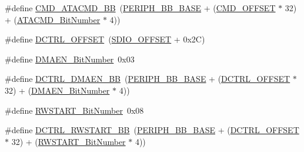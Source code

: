 \begin{DoxyCompactItemize}
\item 
\#define \hyperlink{group___s_d_i_o___private___types_definitions_gabb7e537f931b6fdd3b49e826f2e19d7c}{C\+M\+D\+\_\+\+A\+T\+A\+C\+M\+D\+\_\+\+BB}~(\hyperlink{openmotestm_2library_2inc_2stm32f10x__map_8h_aed7efc100877000845c236ccdc9e144a}{P\+E\+R\+I\+P\+H\+\_\+\+B\+B\+\_\+\+B\+A\+SE} + (\hyperlink{openmotestm_2library_2src_2stm32f10x__sdio_8c_af12d26702ce7a88d2a3dae87f000b75e}{C\+M\+D\+\_\+\+O\+F\+F\+S\+ET} $\ast$ 32) + (\hyperlink{openmotestm_2library_2src_2stm32f10x__sdio_8c_abd4fd3bb700b879f843ccc867db1832e}{A\+T\+A\+C\+M\+D\+\_\+\+Bit\+Number} $\ast$ 4))
\item 
\#define \hyperlink{group___s_d_i_o___private___types_definitions_ga948c1382c4cfd3af3e406c4d0cdd4240}{D\+C\+T\+R\+L\+\_\+\+O\+F\+F\+S\+ET}~(\hyperlink{openmotestm_2library_2src_2stm32f10x__sdio_8c_abf07aced03df5f46d57cea1d4f56d1e3}{S\+D\+I\+O\+\_\+\+O\+F\+F\+S\+ET} + 0x2\+C)
\item 
\#define \hyperlink{group___s_d_i_o___private___types_definitions_gab2af311e327213503f0dbf3d013b7944}{D\+M\+A\+E\+N\+\_\+\+Bit\+Number}~0x03
\item 
\#define \hyperlink{group___s_d_i_o___private___types_definitions_ga43f7336d4f955c6cf1f676ccbc043fe9}{D\+C\+T\+R\+L\+\_\+\+D\+M\+A\+E\+N\+\_\+\+BB}~(\hyperlink{openmotestm_2library_2inc_2stm32f10x__map_8h_aed7efc100877000845c236ccdc9e144a}{P\+E\+R\+I\+P\+H\+\_\+\+B\+B\+\_\+\+B\+A\+SE} + (\hyperlink{openmotestm_2library_2src_2stm32f10x__sdio_8c_a948c1382c4cfd3af3e406c4d0cdd4240}{D\+C\+T\+R\+L\+\_\+\+O\+F\+F\+S\+ET} $\ast$ 32) + (\hyperlink{openmotestm_2library_2src_2stm32f10x__sdio_8c_ab2af311e327213503f0dbf3d013b7944}{D\+M\+A\+E\+N\+\_\+\+Bit\+Number} $\ast$ 4))
\item 
\#define \hyperlink{group___s_d_i_o___private___types_definitions_ga773045c51d3e8daee0c181517c44a2df}{R\+W\+S\+T\+A\+R\+T\+\_\+\+Bit\+Number}~0x08
\item 
\#define \hyperlink{group___s_d_i_o___private___types_definitions_gac776c39dfac0e1ed007217133e1145c3}{D\+C\+T\+R\+L\+\_\+\+R\+W\+S\+T\+A\+R\+T\+\_\+\+BB}~(\hyperlink{openmotestm_2library_2inc_2stm32f10x__map_8h_aed7efc100877000845c236ccdc9e144a}{P\+E\+R\+I\+P\+H\+\_\+\+B\+B\+\_\+\+B\+A\+SE} + (\hyperlink{openmotestm_2library_2src_2stm32f10x__sdio_8c_a948c1382c4cfd3af3e406c4d0cdd4240}{D\+C\+T\+R\+L\+\_\+\+O\+F\+F\+S\+ET} $\ast$ 32) + (\hyperlink{openmotestm_2library_2src_2stm32f10x__sdio_8c_a773045c51d3e8daee0c181517c44a2df}{R\+W\+S\+T\+A\+R\+T\+\_\+\+Bit\+Number} $\ast$ 4))
\item 

\end{DoxyCompactItemize}
